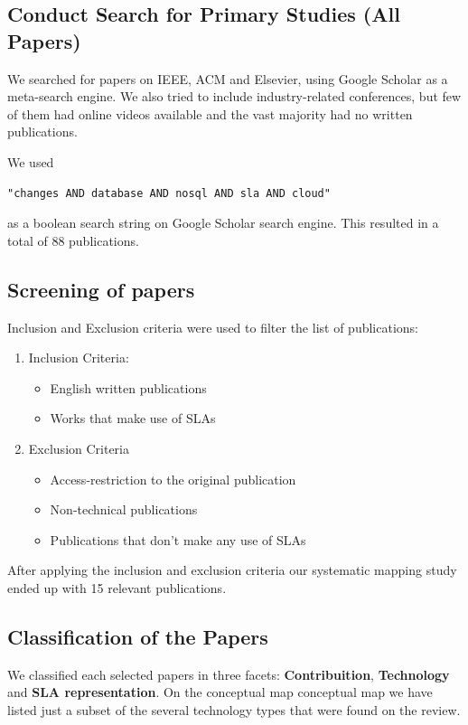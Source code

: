 \documentclass{article}
\begin{document}
\subsection{Conduct Search for Primary Studies (All Papers)}

We searched for papers on IEEE, ACM and Elsevier, using Google Scholar as a meta-search engine. We also tried to include industry-related conferences, but few of them had online videos available and the vast majority had no written publications.

We used \begin{verbatim}"changes AND database AND nosql AND sla AND cloud"\end{verbatim} as a boolean search string on Google Scholar search engine. This resulted in a total of 88 publications.


\subsection{Screening of papers}
Inclusion and Exclusion criteria were used to filter the list of publications:
\begin{enumerate}
    \item Inclusion Criteria: 
    \begin{itemize}
  		\item English written publications
  		\item Works that make use of SLAs 
    \end{itemize}
    \item Exclusion Criteria
	\begin{itemize}
		\item Access-restriction to the original publication
		\item Non-technical publications 
		\item Publications that don't make any use of SLAs	
    \end{itemize}
    
\end{enumerate}

After applying the inclusion and exclusion criteria our systematic mapping study ended up with 15 relevant publications.

\subsection{Classification of the Papers}

We classified each selected papers in three facets: \textbf{Contribuition}, \textbf{Technology} and \textbf{SLA representation}. On the conceptual map conceptual map we have listed just a subset of the several technology types that were found on the review.
\end{document}
